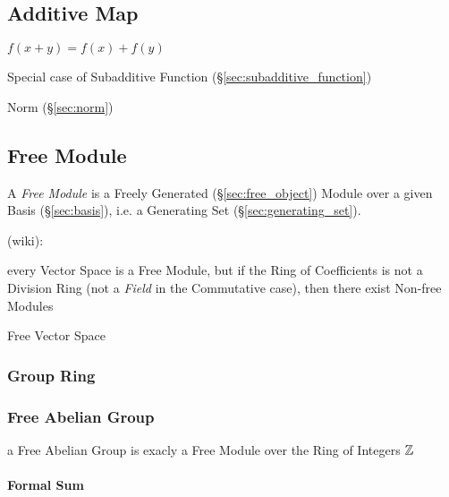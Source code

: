\subsection{Additive Map}\label{sec:additive_map}

$f(x + y) = f(x) + f(y)$

Special case of Subadditive Function (\S\ref{sec:subadditive_function})

Norm (\S\ref{sec:norm})



\subsection{Free Module}\label{sec:free_module}

A \emph{Free Module} is a Freely Generated (\S\ref{sec:free_object}) Module
over a given Basis (\S\ref{sec:basis}), i.e. a Generating Set
(\S\ref{sec:generating_set}).

(wiki):

every Vector Space is a Free Module, but if the Ring of Coefficients is not a
Division Ring (not a \emph{Field} in the Commutative case), then there exist
Non-free Modules

Free Vector Space



\subsubsection{Group Ring}\label{sec:group_ring}

\subsubsection{Free Abelian Group}\label{sec:free_abelian_group}

a Free Abelian Group is exacly a Free Module over the Ring of Integers $\mathbb{Z}$



\paragraph{Formal Sum}\label{sec:formal_sum}\hfill



